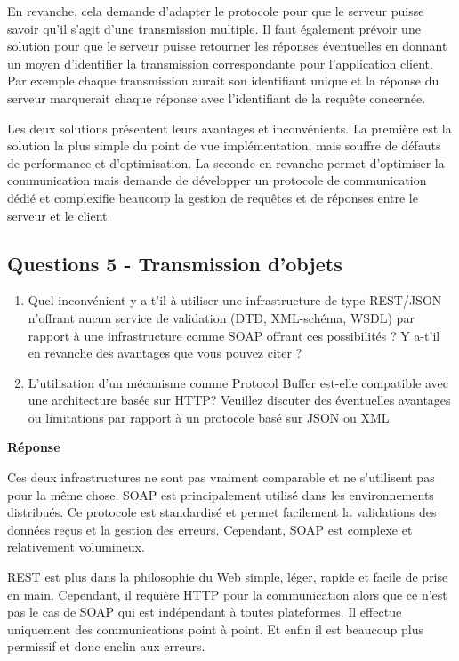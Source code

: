 \documentclass[francais,12pt]{article}
\begin{document}
	En revanche, cela demande d'adapter le protocole pour que le serveur puisse savoir qu'il s'agit d'une transmission multiple. Il faut également prévoir une solution pour que le serveur puisse retourner les réponses éventuelles en donnant un moyen d'identifier la transmission correspondante pour l'application client. Par exemple chaque transmission aurait son identifiant unique et la réponse du serveur marquerait chaque réponse avec l'identifiant de la requête concernée.
	
	Les deux solutions présentent leurs avantages et inconvénients. La première est la solution la plus simple du point de vue implémentation, mais souffre de défauts de performance et d'optimisation. La seconde en revanche permet d'optimiser la communication mais demande de développer un protocole de communication dédié et complexifie beaucoup la gestion de requêtes et de réponses entre le serveur et le client.
	
	
	\subsection*{Questions 5 - Transmission d'objets}  
	\begin{enumerate}
		\item Quel inconvénient y a-t'il à utiliser une infrastructure de type REST/JSON n'offrant aucun service de validation (DTD, XML-schéma, WSDL) par rapport à une infrastructure comme SOAP offrant ces possibilités ? Y a-t'il en revanche des avantages que vous pouvez citer ?
		\item L'utilisation d'un mécanisme comme Protocol Buffer est-elle compatible avec une architecture basée sur HTTP? Veuillez discuter des éventuelles avantages ou limitations par rapport à un protocole basé sur JSON ou XML.
	\end{enumerate} 
	
	{\color[rgb]{0,0.5,0.23}\textbf{Réponse}}
	
    Ces deux infrastructures ne sont pas vraiment comparable et ne s'utilisent pas pour la même chose. SOAP est principalement utilisé dans les environnements distribués. Ce protocole est standardisé et permet facilement la validations des données reçus et la gestion des erreurs. Cependant, SOAP est complexe et relativement volumineux.
    
    REST est plus dans la philosophie du Web simple, léger, rapide et facile de prise en main. Cependant, il requière HTTP pour la communication alors que ce n'est pas le cas de SOAP qui est indépendant à toutes plateformes. Il effectue uniquement des communications point à point. Et enfin il est beaucoup plus permissif et donc enclin aux erreurs.
    
\end{document}
